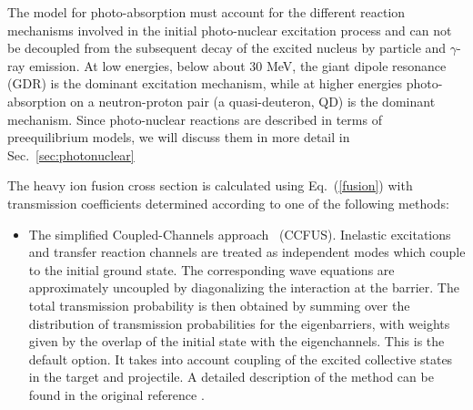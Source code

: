 The model for photo-absorption must account for the different reaction
mechanisms involved in the initial photo-nuclear excitation process and can
not be decoupled from the subsequent decay of the excited nucleus by
particle and $\gamma$-ray emission. At low energies, below about 30 MeV, the
giant dipole resonance (GDR) is the dominant excitation mechanism, while at
higher energies photo-absorption on a neutron-proton pair (a quasi-deuteron,
QD) is the dominant mechanism. Since photo-nuclear reactions are described
in terms of preequilibrium models, we will discuss them in more detail in
Sec.~\ref{sec:photonuclear}

The heavy ion fusion cross section is calculated using Eq.~(\ref{fusion}) with
transmission coefficients determined according to one of the following
methods:

\begin{itemize}
\item The simplified Coupled-Channels approach~\cite{CCFUS} (CCFUS).
Inelastic excitations and transfer reaction channels are treated as
independent modes which couple to the initial ground state. The
corresponding wave equations are approximately uncoupled by diagonalizing
the interaction at the barrier. The total transmission probability is then
obtained by summing over the distribution of transmission probabilities for
the eigenbarriers, with weights given by the overlap of the initial state
with the eigenchannels. This is the default option. It takes into account
coupling of the excited collective states in the target and projectile. A
detailed description of the method can be found in the original reference
\cite{CCFUS}.


\end{itemize}
